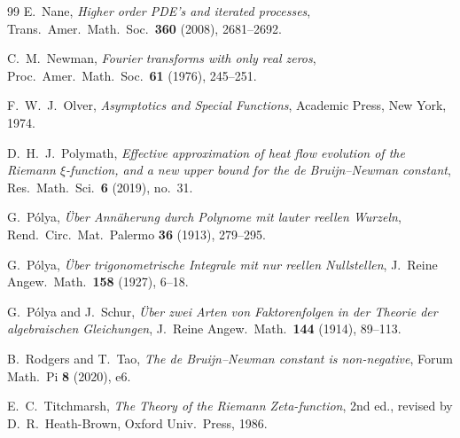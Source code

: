 \documentclass[11pt,reqno]{amsart}
\theoremstyle{plain}
\theoremstyle{definition}
\theoremstyle{remark}
\begin{document}
\begin{thebibliography}{99}
 E.~Nane, \emph{Higher order PDE's and iterated processes},
Trans.\ Amer.\ Math.\ Soc.\ \textbf{360} (2008), 2681--2692.

 C.~M.~Newman, \emph{Fourier transforms with only real zeros},
Proc.\ Amer.\ Math.\ Soc.\ \textbf{61} (1976), 245--251.

 F.~W.~J.~Olver, \emph{Asymptotics and Special Functions},
Academic Press, New York, 1974.

 D.~H.~J.~Polymath, \emph{Effective approximation of heat
flow evolution of the Riemann $\xi$-function, and a new upper bound for the de
Bruijn--Newman constant}, Res.\ Math.\ Sci.\ \textbf{6} (2019), no.~31.

 G.~P\'olya, \emph{\"Uber Ann\"aherung durch Polynome mit
lauter reellen Wurzeln}, Rend.\ Circ.\ Mat.\ Palermo \textbf{36} (1913),
279--295.

 G.~P\'olya, \emph{\"Uber trigonometrische Integrale mit nur
reellen Nullstellen}, J.\ Reine Angew.\ Math.\ \textbf{158} (1927), 6--18.

 G.~P\'olya and J.~Schur, \emph{\"Uber zwei Arten von
Faktorenfolgen in der Theorie der algebraischen Gleichungen}, J.\ Reine
Angew.\ Math.\ \textbf{144} (1914), 89--113.

 B.~Rodgers and T.~Tao, \emph{The de Bruijn--Newman
constant is non-negative}, Forum Math.\ Pi \textbf{8} (2020), e6.

 E.~C.~Titchmarsh, \emph{The Theory of the Riemann
Zeta-function}, 2nd ed., revised by D.~R.~Heath-Brown, Oxford Univ.\ Press,
1986.

\end{thebibliography}
\end{document}
